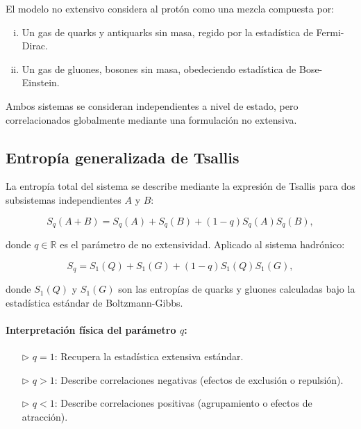 El modelo no extensivo considera al protón como una mezcla compuesta por:

\begin{enumerate}[i.]
    \item Un gas de quarks y antiquarks sin masa, regido por la estadística de Fermi-Dirac.
    \item Un gas de gluones, bosones sin masa, obedeciendo estadística de Bose-Einstein.
\end{enumerate}

Ambos sistemas se consideran independientes a nivel de estado, pero correlacionados globalmente mediante una formulación no extensiva.

\subsection{Entropía generalizada de Tsallis}

La entropía total del sistema se describe mediante la expresión de Tsallis para dos subsistemas independientes \( A \) y \( B \):

\begin{equation}
S_q(A+B) = S_q(A) + S_q(B) + (1 - q) S_q(A) S_q(B),
\end{equation}

donde \( q \in \mathbb{R} \) es el parámetro de no extensividad. Aplicado al sistema hadrónico:

\begin{equation}\label{eq-Entropy-Tsallis}
S_q = S_1(Q) + S_1(G) + (1 - q) S_1(Q) S_1(G),
\end{equation}

donde \( S_1(Q) \) y \( S_1(G) \) son las entropías de quarks y gluones calculadas bajo la estadística estándar de Boltzmann-Gibbs.

\paragraph{Interpretación física del parámetro \( q \):}
\begin{itemize}
    \item[$\triangleright$] \( q = 1 \): Recupera la estadística extensiva estándar.
    \item[$\triangleright$] \( q > 1 \): Describe correlaciones negativas (efectos de exclusión o repulsión).
    \item[$\triangleright$] \( q < 1 \): Describe correlaciones positivas (agrupamiento o efectos de atracción).
\end{itemize}

